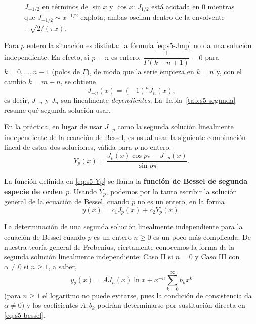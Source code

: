 \begin{figure}[H]
\centering
{}
\caption{$J_{\pm1/2}$ en términos de $\sin x$ y $\cos x$: $J_{1/2}$ está acotada en $0$ mientras que $J_{-1/2}\sim x^{-1/2}$ explota; ambas oscilan dentro de la envolvente $\pm\sqrt{2/(\pi x)}$.}
\label{fig:s5-medio}
\end{figure}
 
Para $p$ entero la situación es distinta: la fórmula \eqref{eq:s5-Jmp} no da una solución independiente. En efecto, si $p=n$ es entero, $\dfrac{1}{\Gamma(k-n+1)}=0$ para $k=0,\dots,n-1$ (polos de $\Gamma$), de modo que la serie empieza en $k=n$ y, con el cambio $k=m+n$, se obtiene
\[ J_{-n}(x)=(-1)^nJ_n(x), \]
es decir, $J_{-n}$ y $J_n$ son linealmente \emph{dependientes}. La Tabla~\ref{tab:s5-segunda} resume qué segunda solución usar.
 
En la práctica, en lugar de usar $J_{-p}$ como la segunda solución linealmente independiente de la ecuación de Bessel, es usual usar la siguiente combinación lineal de estas dos soluciones, válida para $p$ no entero:
\begin{equation}
Y_p(x) = \frac{J_p(x) \cos p\pi - J_{-p}(x)}{\sin p\pi}.
\label{eq:s5-Yp}
\end{equation}
 
La función definida en \eqref{eq:s5-Yp} se llama la \textbf{función de Bessel de segunda especie de orden $p$}. Usando $Y_p$, podemos por lo tanto escribir la solución general de la ecuación de Bessel, cuando $p$ no es un entero, en la forma
\begin{equation}
y(x) = c_1 J_p(x) + c_2 Y_p(x).
\label{eq:s5-gen-Yp}
\end{equation}
 
La determinación de una segunda solución linealmente independiente para la ecuación de Bessel cuando $p$ es un entero $n\ge0$ es un poco más complicada. De nuestra teoría general de Frobenius, ciertamente conocemos la forma de la segunda solución linealmente independiente: Caso II si $n=0$ y Caso III con $\alpha\neq0$ si $n\ge1$, a saber,
\[ y_2(x) = A J_n(x) \ln x + x^{-n} \sum_{k=0}^{\infty} b_k x^k \]
(para $n\ge1$ el logaritmo no puede evitarse, pues la condición de consistencia da $\alpha\neq0$) y los coeficientes $A, b_k$ podrían determinarse por sustitución directa en \eqref{eq:s5-bessel}.
 
